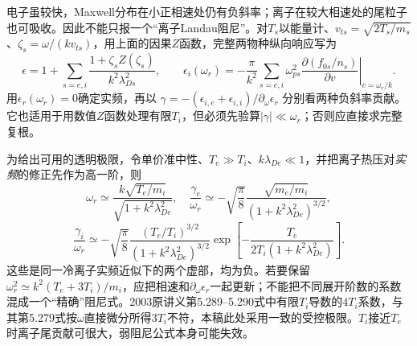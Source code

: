 电子虽较快，Maxwell分布在小正相速处仍有负斜率；离子在较大相速处的尾粒子也可吸收。因此不能只报一个“离子Landau阻尼”。对$T_s$以能量计、$v_{ts}=\sqrt{2T_s/m_s}$、$\zeta_s=\omega/(kv_{ts})$，用上面的因果$Z$函数，完整两物种纵向响应写为
\begin{equation}
\epsilon=1+\sum_{s=e,i}\frac{1+\zeta_sZ(\zeta_s)}
{k^2\lambda_{Ds}^2},\qquad
\epsilon_i(\omega_r)=
-\frac{\pi}{k^2}\sum_{s=e,i}\omega_{ps}^2
\left.\frac{\partial (f_{0s}/n_s)}{\partial v}\right|_{v=\omega_r/k}.
\end{equation}
用$\epsilon_r(\omega_r)=0$确定实频，再以
$\gamma=-(\epsilon_{i,e}+\epsilon_{i,i})/\partial_\omega\epsilon_r$
分别看两种负斜率贡献。它也适用于用数值$Z$函数处理有限$T_i$，但必须先验算$|\gamma|\ll\omega_r$；否则应直接求完整复根。

为给出可用的透明极限，令单价准中性、$T_e\gg T_i$、$k\lambda_{De}\ll1$，并把离子热压对\emph{实频}的修正先作为高一阶，则
\begin{equation}
\omega_r\simeq\frac{k\sqrt{T_e/m_i}}{\sqrt{1+k^2\lambda_{De}^2}},
\quad
\frac{\gamma_e}{\omega_r}\simeq
-\sqrt{\frac{\pi}{8}}\frac{\sqrt{m_e/m_i}}
{(1+k^2\lambda_{De}^2)^{3/2}},
\end{equation}
\begin{equation}
\frac{\gamma_i}{\omega_r}\simeq
-\sqrt{\frac{\pi}{8}}\frac{(T_e/T_i)^{3/2}}
{(1+k^2\lambda_{De}^2)^{3/2}}
\exp\!\left[-\frac{T_e}{2T_i(1+k^2\lambda_{De}^2)}\right].
\end{equation}
这些是同一冷离子实频近似下的两个虚部，均为负。若要保留$\omega_r^2\simeq k^2(T_e+3T_i)/m_i$，应把相速和$\partial_\omega\epsilon_r$一起更新；不能把不同展开阶数的系数混成一个“精确”阻尼式。2003原讲义第5.289--5.290式中有限$T_i$导数的$4T_i$系数，与其第5.279式按$\omega$直接微分所得$3T_i$不符，本稿此处采用一致的受控极限。$T_i$接近$T_e$时离子尾贡献可很大，弱阻尼公式本身可能失效。
